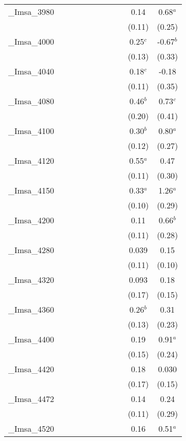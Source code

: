 \documentclass[]{article}
\begin{document}
\begin{tabular}{lcccccccccc}
\_Imsa\_3980 &  &  &  &  &  &  &  &  & 0.14 & 0.68$^a$ \\
 &  &  &  &  &  &  &  &  & (0.11) & (0.25) \\
\_Imsa\_4000 &  &  &  &  &  &  &  &  & 0.25$^c$ & -0.67$^b$ \\
 &  &  &  &  &  &  &  &  & (0.13) & (0.33) \\
\_Imsa\_4040 &  &  &  &  &  &  &  &  & 0.18$^c$ & -0.18 \\
 &  &  &  &  &  &  &  &  & (0.11) & (0.35) \\
\_Imsa\_4080 &  &  &  &  &  &  &  &  & 0.46$^b$ & 0.73$^c$ \\
 &  &  &  &  &  &  &  &  & (0.20) & (0.41) \\
\_Imsa\_4100 &  &  &  &  &  &  &  &  & 0.30$^b$ & 0.80$^a$ \\
 &  &  &  &  &  &  &  &  & (0.12) & (0.27) \\
\_Imsa\_4120 &  &  &  &  &  &  &  &  & 0.55$^a$ & 0.47 \\
 &  &  &  &  &  &  &  &  & (0.11) & (0.30) \\
\_Imsa\_4150 &  &  &  &  &  &  &  &  & 0.33$^a$ & 1.26$^a$ \\
 &  &  &  &  &  &  &  &  & (0.10) & (0.29) \\
\_Imsa\_4200 &  &  &  &  &  &  &  &  & 0.11 & 0.66$^b$ \\
 &  &  &  &  &  &  &  &  & (0.11) & (0.28) \\
\_Imsa\_4280 &  &  &  &  &  &  &  &  & 0.039 & 0.15 \\
 &  &  &  &  &  &  &  &  & (0.11) & (0.10) \\
\_Imsa\_4320 &  &  &  &  &  &  &  &  & 0.093 & 0.18 \\
 &  &  &  &  &  &  &  &  & (0.17) & (0.15) \\
\_Imsa\_4360 &  &  &  &  &  &  &  &  & 0.26$^b$ & 0.31 \\
 &  &  &  &  &  &  &  &  & (0.13) & (0.23) \\
\_Imsa\_4400 &  &  &  &  &  &  &  &  & 0.19 & 0.91$^a$ \\
 &  &  &  &  &  &  &  &  & (0.15) & (0.24) \\
\_Imsa\_4420 &  &  &  &  &  &  &  &  & 0.18 & 0.030 \\
 &  &  &  &  &  &  &  &  & (0.17) & (0.15) \\
\_Imsa\_4472 &  &  &  &  &  &  &  &  & 0.14 & 0.24 \\
 &  &  &  &  &  &  &  &  & (0.11) & (0.29) \\
\_Imsa\_4520 &  &  &  &  &  &  &  &  & 0.16 & 0.51$^a$ \\

\end{tabular}
\end{document}
